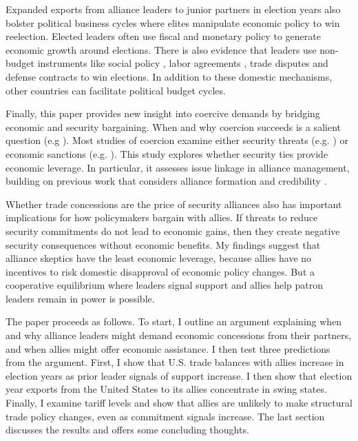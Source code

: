 \documentclass[12pt]{article}
\begin{document}
Expanded exports from alliance leaders to junior partners in election years also bolster political business cycles where elites manipulate economic policy to win reelection. 
Elected leaders often use fiscal \citep{Rogoff1987} and monetary policy \citep{ClarkHallerberg2000} to generate economic growth around elections. 
There is also evidence that leaders use non-budget instruments like social policy \citep{Philips2020}, labor agreements \citep{Ahlquist2010}, trade disputes \citep{Conconietal2017} and defense contracts \citep{DerouenHeo2000} to win elections. 
In addition to these domestic mechanisms, other countries can facilitate political budget cycles. 


Finally, this paper provides new insight into coercive demands by bridging economic and security bargaining.
When and why coercion succeeds is a salient question (e.g \citep{Sechser2010, Sechser2018, Cebuletal2021}).  
Most studies of coercion examine either security threats (e.g. \citep{HorowitzReiter2001, Sechser2011}) or economic sanctions (e.g. \citep{Marinov2005, Allen2008, Escriba-FolchWright2010}).
This study explores whether security ties provide economic leverage. 
In particular, it assesses issue linkage in alliance management, building on previous work that considers alliance formation \citep{Poast2012} and credibility \citep{Davis2008, Poast2013}. 


Whether trade concessions are the price of security alliances also has important implications for how policymakers bargain with allies. 
If threats to reduce security commitments do not lead to economic gains, then they create negative security consequences without economic benefits. 
My findings suggest that alliance skeptics have the least economic leverage, because allies have no incentives to risk domestic disapproval of economic policy changes.
But a cooperative equilibrium where leaders signal support and allies help patron leaders remain in power is possible. 


The paper proceeds as follows. 
To start, I outline an argument explaining when and why alliance leaders might demand economic concessions from their partners, and when allies might offer economic assistance. 
I then test three predictions from the argument. 
First, I show that U.S. trade balances with allies increase in election years as prior leader signals of support increase. 
I then show that election year exports from the United States to its allies concentrate in swing states. 
Finally, I examine tariff levels and show that allies are unlikely to make structural trade policy changes, even as commitment signals increase. 
The last section discusses the results and offers some concluding thoughts.
\end{document}
